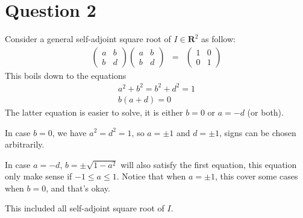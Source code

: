 \section*{Question 2}
Consider a general self-adjoint square root of $ I \in \mathbf{R}^2 $ as follow:
\begin{eqnarray*}
  \left(\begin{array}{cc}
    a & b \\ 
    b & d 
  \end{array}\right)\left(\begin{array}{cc}
    a & b \\ 
    b & d 
  \end{array}\right) &=& \left(\begin{array}{cc}
    1 & 0 \\ 
    0 & 1 
  \end{array}\right)
\end{eqnarray*}
This boils down to the equations
\begin{eqnarray*}
  a^2 + b^2 = b^2 + d^2 = 1 \\
  b(a + d) = 0 
\end{eqnarray*}
The latter equation is easier to solve, it is either $ b = 0 $ or $ a = -d $ (or both).

In case $ b = 0 $, we have $ a^2 = d^2 = 1 $, so $ a = \pm 1 $ and $ d = \pm 1 $, signs can be chosen arbitrarily.

In case $ a = -d $, $ b = \pm\sqrt{1 - a^2} $ will also satisfy the first equation, this equation only make sense if $ -1 \le a \le 1 $. Notice that when $ a = \pm 1 $, this cover some cases when $ b = 0 $, and that's okay.

This included all self-adjoint square root of $ I $.